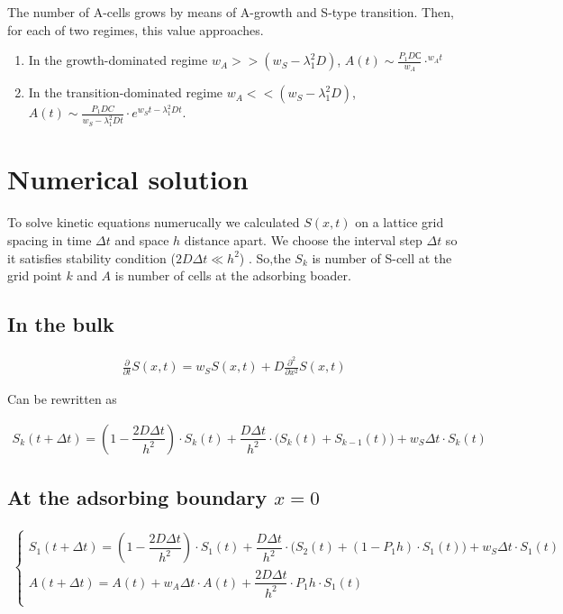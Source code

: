 \documentclass[10pt, oneside]{article}
\begin{document}
The number of A-cells grows by means of A-growth and S-type  transition.
Then, for each of two regimes, this value approaches.
\begin{enumerate}
	\item In the growth-dominated regime $w_A >> (w_S-\lambda_1^{2}D)$, $A(t)\sim \frac{P_1DС}{w_A}\cdot^{w_A t}$ 
	\item In the transition-dominated regime $w_A << (w_S-\lambda_1^{2}D)$, $A(t) \sim \frac{P_1DC}{w_S - \lambda_1^{2}Dt} \cdot e^{w_St-\lambda_1^{2}Dt}$.
\end{enumerate}






\section{Numerical solution}
To solve kinetic equations numerucally we calculated $S(x,t)$ on a lattice grid spacing in time $\Delta t$ and space  $h$ distance apart. We choose the interval step $\Delta t$ so it satisfies stability condition ($ 2D\Delta t\ll h^{2}$) . So,the  $S_k$ is number of S-cell  at the grid point  $k$ and $A$ is number of cells at the adsorbing boader.
\subsection{In the bulk}
\begin{linenomath}
	\begin{align} 
	\frac{\partial}{\partial t} S(x,t)= w_SS(x,t) + D \frac{\partial^2}{\partial x^2} S(x,t)
	\end{align}
\end{linenomath}

Can be rewritten as
\begin{linenomath}
	\begin{align} 
	S_k(t+\Delta t)=\left(1-\dfrac{2D \Delta t}{h^2}\right) \cdot S_k(t)+
	\dfrac{D \Delta t}{h^2}\cdot \Big(S_k(t)+ S_{k-1}(t)\Big)+
	w_S \Delta t\cdot S_k(t)
	\end{align}
\end{linenomath}

 

\subsection{At the  adsorbing boundary $x=0$}
\begin{linenomath}
	\begin{align}
	\begin{cases} 
	S_1(t+\Delta t)=\left(1-\dfrac{2D\Delta t}{h^2}\right) \cdot S_1(t)+
	\dfrac{D\Delta t}{h^2}\cdot \Big(S_2(t)+(1-P_1h)\cdot S_1(t)\Big)+
	w_S \Delta t\cdot S_1(t)\\
	A(t+\Delta t)=A(t)+w_A \Delta t \cdot A(t)+\dfrac{2D\Delta t}{h^2} \cdot P_1h\cdot S_1(t)\\
	\end{cases}
	\end{align}
\end{linenomath}
\end{document}

